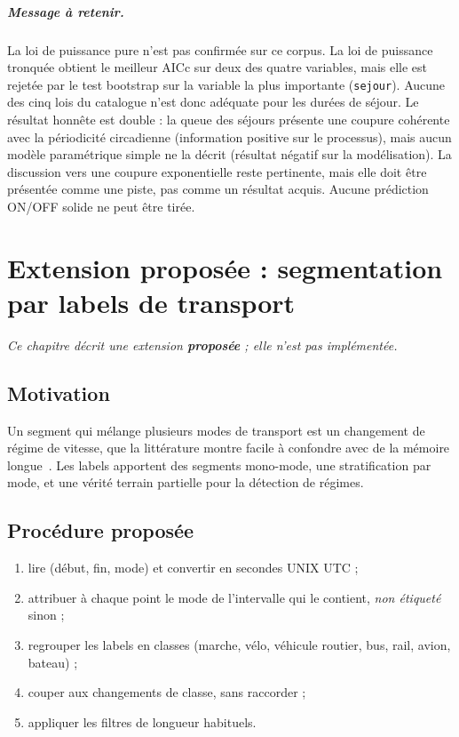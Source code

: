 \documentclass[12pt,a4paper]{report}
\theoremstyle{definition}
\DeclareRobustCommand{\code}[1]{\texorpdfstring{\texttt{\detokenize{#1}}}{\detokenize{#1}}}
\begin{document}
\paragraph{Message à retenir.} La loi de puissance pure n'est pas confirmée sur ce
corpus. La loi de puissance tronquée obtient le meilleur AICc sur deux des quatre
variables, mais elle est rejetée par le test bootstrap sur la variable la plus importante
(\texttt{sejour}). Aucune des cinq lois du catalogue n'est donc adéquate pour les durées
de séjour. Le résultat honnête est double : la queue des séjours présente une coupure
cohérente avec la périodicité circadienne (information positive sur le processus), mais
aucun modèle paramétrique simple ne la décrit (résultat négatif sur la modélisation). La
discussion vers une coupure exponentielle reste pertinente, mais elle doit être présentée
comme une piste, pas comme un résultat acquis. Aucune prédiction ON/OFF solide ne peut
être tirée.

\chapter{Extension proposée : segmentation par labels de transport}
\label{ch:labels}

\emph{Ce chapitre décrit une extension \textbf{proposée} ; elle n'est pas implémentée.}

\section{Motivation}

Un segment qui mélange plusieurs modes de transport est un changement de régime de vitesse,
que la littérature montre facile à confondre avec de la mémoire
longue~\cite{diebold2001}. Les labels apportent des segments mono-mode, une stratification
par mode, et une vérité terrain partielle pour la détection de régimes.

\section{Procédure proposée}

\begin{enumerate}
  \item lire \code{labels.txt} (début, fin, mode) et convertir en secondes UNIX UTC ;
  \item attribuer à chaque point le mode de l'intervalle qui le contient, \emph{non
  étiqueté} sinon ;
  \item regrouper les labels en classes (marche, vélo, véhicule routier, bus, rail, avion,
  bateau) ;
  \item couper aux changements de classe, sans raccorder ;
  \item appliquer les filtres de longueur habituels.
\end{enumerate}
\end{document}
